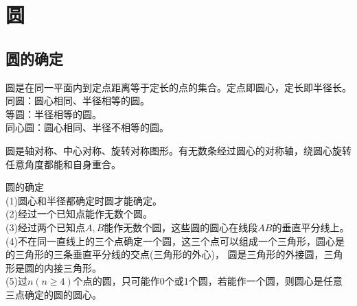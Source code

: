\chapter{圆}
\section{圆的确定}
\begin{theorem}
    圆是在同一平面内到定点距离等于定长的点的集合。定点即圆心，定长即半径长。\\
    同圆：圆心相同、半径相等的圆。\\
    等圆：半径相等的圆。\\
    同心圆：圆心相同、半径不相等的圆。
\end{theorem}
\begin{theorem}
    圆是轴对称、中心对称、旋转对称图形。有无数条经过圆心的对称轴，绕圆心旋转任意角度都能和自身重合。
\end{theorem}
\begin{theorem}
    圆的确定 \\
    (1)圆心和半径都确定时圆才能确定。\\
    (2)经过一个已知点能作无数个圆。 \\
    (3)经过两个已知点$A,B$能作无数个圆，这些圆的圆心在线段$AB$的垂直平分线上。\\
    (4)不在同一直线上的三个点确定一个圆，这三个点可以组成一个三角形，圆心是的三角形的三条垂直平分线的交点(三角形的外心)，
    圆是三角形的外接圆，三角形是圆的内接三角形。\\
    (5)过$n(n\ge 4)$个点的圆，只可能作0个或1个圆，若能作一个圆，则圆心是任意三点确定的圆的圆心。
\end{theorem}
\clearpage
